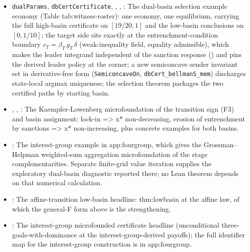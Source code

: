 \begin{itemize}[leftmargin=1.4em,itemsep=1pt]
\item \texttt{dualParams}, \texttt{dbCertCertificate}, , , : The dual-basin selection example economy (Table tab:witness-roster): one economy, one equilibrium, carrying the full high-basin certificate on $[19/20,1]$ and the low-basin conclusions on $[0,1/10]$; the target side sits exactly at the entrenchment-condition boundary $c_T=\beta_T\,g_T\,\delta$ (weak-inequality field, equality admissible), which makes the leader integrand independent of the sanction response () and pins the derived leader policy at the corner; a new semiconcave sender invariant set in derivative-free form (\texttt{SemiconcaveOn}, \texttt{dbCert\_bellmanS\_mem}) discharges state-local argmax uniqueness; the selection theorem packages the two certified paths by starting basin.
\item {}, , : The Kaempfer-Lowenberg microfoundation of the transition sign (F3) and basin assignment: lock-in =\textgreater{} x* non-decreasing, erosion of entrenchment by sanctions =\textgreater{} x* non-increasing, plus concrete examples for both basins.
\item {}: The interest-group example in
app:fourgroup, which gives the Grossman--Helpman weighted-sum
aggregation microfoundation of the stage complementarities. Separate
finite-grid value iteration supplies the exploratory dual-basin
diagnostic reported there; no Lean theorem depends on that numerical
calculation.
\item {}: The affine-transition low-basin headline: thm:lowbasin at the affine law, of which the general-F form above is the strengthening.
\item {}: The interest-group microfounded certificate headline (unconditional three-goals-with-dominance at the interest-group-derived payoffs); the full identifier map for the interest-group construction is in app:fourgroup.

\end{itemize}
